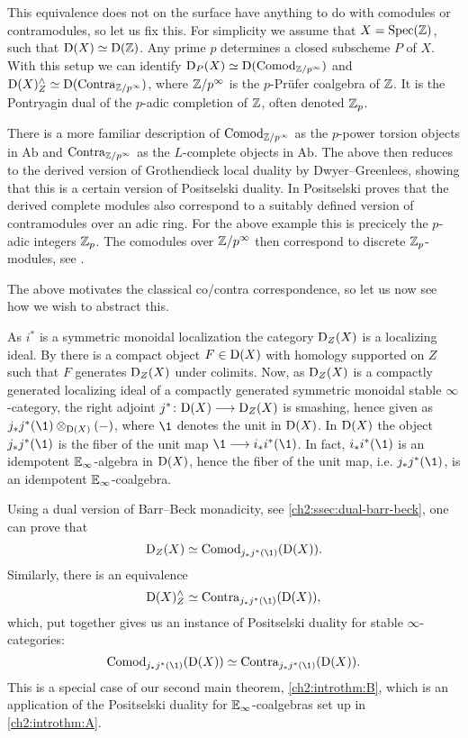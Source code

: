This equivalence does not on the surface have anything to do with comodules or contramodules, so let us fix this. For simplicity we assume that $X = \operatorname{Spec}(\mathbb{Z})$, such that $\mathrm{D}(X)\simeq \mathrm{D}(\mathbb{Z})$. Any prime $p$ determines a closed subscheme $P$ of $X$. With this setup we can identify $\mathrm{D}_P(X) \simeq \mathrm{D}(\mathrm{Comod}_{\mathbb{Z}/p^\infty})$ and $\mathrm{D}(X)^\wedge_Z\simeq \mathrm{D}(\mathrm{Contra}_{\mathbb{Z}/p^\infty})$, where $\mathbb{Z}/p^\infty$ is the $p$-Prüfer coalgebra of $\mathbb{Z}$. It is the Pontryagin dual of the $p$-adic completion of $\mathbb{Z}$, often denoted $\mathbb{Z}_p$. 

\begin{introrm}
    There is a more familiar description of $\mathrm{Comod}_{\mathbb{Z}/p^\infty}$ as the $p$-power torsion objects in $\mathrm{Ab}$ and $\mathrm{Contra}_{\mathbb{Z}/p^\infty}$ as the $L$-complete objects in $\mathrm{Ab}$. The above then reduces to the derived version of Grothendieck local duality by Dwyer--Greenlees, showing that this is a certain version of Positselski duality. In \cite[2.2(1), 2.2(3)]{positselski_2017_abelian} Positselski proves that the derived complete modules also correspond to a suitably defined version of contramodules over an adic ring. For the above example this is precicely the $p$-adic integers $\mathbb{Z}_p$. The comodules over $\mathbb{Z}/p^\infty$ then correspond to discrete $\mathbb{Z}_p$-modules, see \cite[Sec. 1.9, Sec. 1.10]{positselski_2022_contramodules}. 
\end{introrm}


The above motivates the classical co/contra correspondence, so let us now see how we wish to abstract this.  

As $i^*$ is a symmetric monoidal localization the category $\mathrm{D}_Z(X)$ is a localizing ideal. By \cite[6.8]{rouquier_2008} there is a compact object $F\in \mathrm{D}(X)$ with homology supported on $Z$ such that $F$ generates $\mathrm{D}_Z(X)$ under colimits. Now, as $\mathrm{D}_Z(X)$ is a compactly generated localizing ideal of a compactly generated symmetric monoidal stable $\infty$-category, the right adjoint $j^*\colon \mathrm{D}(X)\longrightarrow \mathrm{D}_Z(X)$ is smashing, hence given as $j_* j^*(\1)\otimes_{\Der(X)} (-)$, where $\1$ denotes the unit in $\mathrm{D}(X)$. In $\mathrm{D}(X)$ the object $j_* j^* (\1)$ is the fiber of the unit map $\1\to i_* i^* (\1)$. In fact, $i_* i^* (\1)$ is an idempotent $\mathbb{E}_\infty$-algebra in $\mathrm{D}(X)$, hence the fiber of the unit map, i.e. $j_* j^*(\1)$, is an idempotent $\mathbb{E}_\infty$-coalgebra. 

Using a dual version of Barr--Beck monadicity, see \cref{ch2:ssec:dual-barr-beck}, one can prove that 
\[\Der_Z(X)\simeq \Comod_{j_* j^* (\1)}(\Der(X)).\] 
Similarly, there is an equivalence 
\[\Der(X)^\wedge_Z \simeq \Contra_{j_* j^* (\1)}(\Der(X)),\]
which, put together gives us an instance of Positselski duality for stable $\infty$-categories:
\[\Comod_{j_* j^* (\1)}(\Der(X)) \simeq \Contra_{j_* j^* (\1)}(\Der(X)).\]
This is a special case of our second main theorem, \cref{ch2:introthm:B}, which is an application of the Positselski duality for $\mathbb{E}_\infty$-coalgebras  set up in \cref{ch2:introthm:A}. 
 

